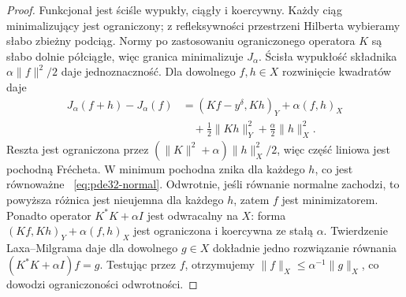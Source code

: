 \begin{proof}
Funkcjonał jest ściśle wypukły, ciągły i koercywny.
Każdy ciąg minimalizujący jest ograniczony; z refleksywności
przestrzeni Hilberta wybieramy słabo zbieżny podciąg.
Normy po zastosowaniu ograniczonego operatora $K$ są słabo
dolnie półciągłe, więc granica minimalizuje $J_\alpha$.
Ścisła wypukłość składnika $\alpha\|f\|^2/2$ daje
jednoznaczność. Dla dowolnego $f,h\in X$ rozwinięcie kwadratów daje
\[
 \begin{aligned}
 J_\alpha(f+h)-J_\alpha(f)
 &= (Kf-y^\delta,Kh)_Y+\alpha(f,h)_X\\
 &\quad+\tfrac12\|Kh\|_Y^2+\tfrac\alpha2\|h\|_X^2.
 \end{aligned}
\]
Reszta jest ograniczona przez
$(\|K\|^2+\alpha)\|h\|_X^2/2$, więc część liniowa
jest pochodną Frécheta. W minimum pochodna
znika dla każdego $h$, co jest równoważne
~\eqref{eq:pde32-normal}. Odwrotnie, jeśli
równanie normalne zachodzi, to powyższa różnica
jest nieujemna dla każdego $h$, zatem $f$
jest minimizatorem.
Ponadto operator $K^*K+\alpha I$ jest odwracalny
na $X$: forma $(Kf,Kh)_Y+\alpha(f,h)_X$
jest ograniczona i koercywna ze stałą $\alpha$.
Twierdzenie Laxa--Milgrama daje dla dowolnego
$g\in X$ dokładnie jedno rozwiązanie równania
$(K^*K+\alpha I)f=g$. Testując przez $f$,
otrzymujemy $\|f\|_X\le\alpha^{-1}\|g\|_X$,
co dowodzi ograniczoności odwrotności.


\end{proof}
